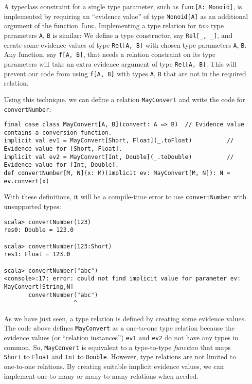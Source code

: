 A typeclass constraint for a single type parameter, such as \lstinline!func[A: Monoid]!,
is implemented by requiring an \textsf{``}evidence value\textsf{''}
of type \lstinline!Monoid[A]! as an additional argument of the function
\lstinline!func!. Implementing a type relation for \emph{two} type
parameters \lstinline!A!, \lstinline!B! is similar: We define a
type constructor, say \lstinline!Rel[_, _]!, and create some evidence
values of type \lstinline!Rel[A, B]! with chosen type parameters
\lstinline!A!, \lstinline!B!. Any function, say \lstinline!f[A, B]!,
that needs a relation constraint on its type parameters will take
an extra evidence argument of type \lstinline!Rel[A, B]!. This will
prevent our code from using \lstinline!f[A, B]! with types \lstinline!A!,
\lstinline!B! that are not in the required relation. 

Using this technique, we can define a relation \lstinline!MayConvert!
and write the code for \lstinline!convertNumber!:
\begin{lstlisting}
final case class MayConvert[A, B](convert: A => B)  // Evidence value contains a conversion function.
implicit val ev1 = MayConvert[Short, Float](_.toFloat)          // Evidence value for [Short, Float].
implicit val ev2 = MayConvert[Int, Double](_.toDouble)          // Evidence value for [Int, Double].
def convertNumber[M, N](x: M)(implicit ev: MayConvert[M, N]): N = ev.convert(x)
\end{lstlisting}
With these definitions, it will be a compile-time error to use \lstinline!convertNumber!
with unsupported types:
\begin{lstlisting}
scala> convertNumber(123)
res0: Double = 123.0

scala> convertNumber(123:Short)
res1: Float = 123.0

scala> convertNumber("abc")
<console>:17: error: could not find implicit value for parameter ev: MayConvert[String,N]
       convertNumber("abc")
                    ^
\end{lstlisting}

As we have just seen, a type relation is defined by creating some
evidence values. The code above defines \lstinline!MayConvert! as
a one-to-one type relation because the evidence values (or \textsf{``}relation
instances\textsf{''}) \lstinline!ev1! and \lstinline!ev2! do not have any
types in common. So, \lstinline!MayConvert! is equivalent to a type-to-type
\emph{function} that maps \lstinline!Short! to \lstinline!Float!
and \lstinline!Int! to \lstinline!Double!. However, type relations
are not limited to one-to-one relations. By creating suitable implicit
evidence values, we can implement one-to-many or many-to-many relations
when needed. 

